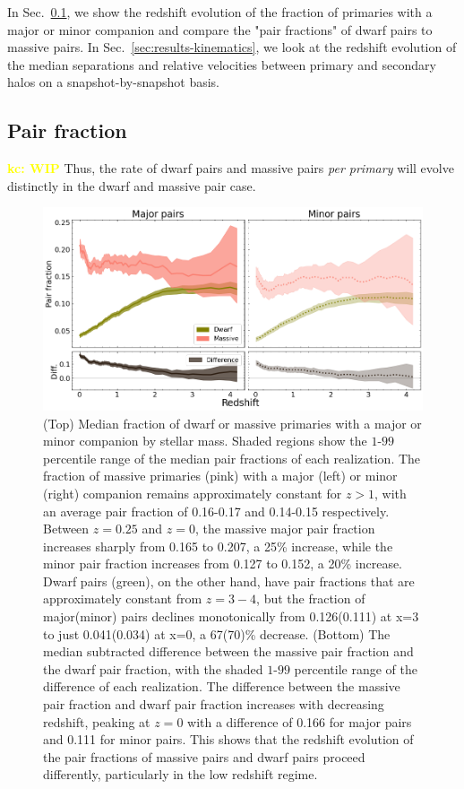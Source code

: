 \documentclass[twocolumn]{aastex631}
\newcommand{\kc}[1]{\textcolor{yellow}{\textbf{kc: #1}} }
\begin{document}
In Sec.~\ref{sec:results-frac}, we show the redshift evolution of the fraction of primaries with a major or minor companion and compare the "pair fractions" of dwarf pairs to massive pairs.
In Sec.~\ref{sec:results-kinematics}, we look at the redshift evolution of the median separations and relative velocities between primary and secondary halos on a snapshot-by-snapshot basis.


\subsection{Pair fraction}\label{sec:results-frac}
\kc{WIP} Thus, the rate of dwarf pairs and massive pairs \textit{per primary} will evolve distinctly in the dwarf and massive pair case.

\label{sec:results}
\begin{figure}[htp]
  \centering
  \includegraphics[width=\textwidth]{pairratio_1000.png}
  \caption{
    (Top) Median fraction of dwarf or massive primaries with a major or minor companion by stellar mass. 
    Shaded regions show the $1$-$99$ percentile range of the median pair fractions of each realization. 
    The fraction of massive primaries (pink) with a major (left) or minor (right) companion remains approximately constant for $z>1$, with an average pair fraction of 0.16-0.17 and 0.14-0.15 respectively. Between $z=0.25$ and $z=0$, the massive major pair fraction increases sharply from 0.165 to 0.207, a 25\% increase, while the minor pair fraction increases from 0.127 to 0.152, a 20\% increase.
    Dwarf pairs (green), on the other hand, have pair fractions that are approximately constant from $z=3-4$, but the fraction of major(minor) pairs declines monotonically from 0.126(0.111) at x=3 to just 0.041(0.034) at x=0, a 67(70)\% decrease. 
  (Bottom) The median subtracted difference between the massive pair fraction and the dwarf pair fraction, with the shaded $1$-$99$ percentile range of the difference of each realization. The difference between the massive pair fraction and dwarf pair fraction increases with decreasing redshift, peaking at $z=0$ with a difference of 0.166 for major pairs and 0.111 for minor pairs. This shows that the redshift evolution of the pair fractions of massive pairs and dwarf pairs proceed differently, particularly in the low redshift regime.}
  \label{fig:pairratio}
\end{figure}
\end{document}
